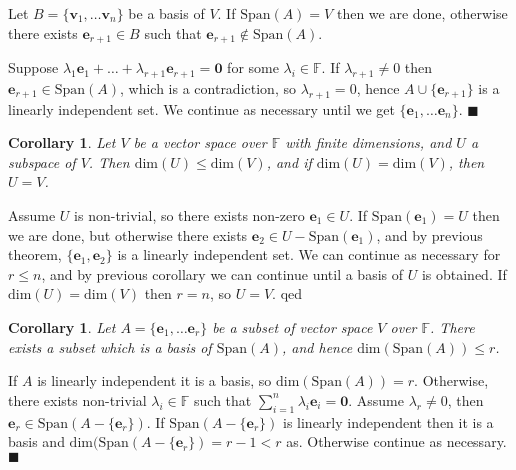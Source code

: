 \documentclass[letter-paper]{tufte-book}
\newtheorem{corollary}[theorem]{\color{pastel-blue}Corollary}
\newenvironment{proof}[1][Proof]{\begin{trivlist}
\item[\hskip \labelsep {\bfseries #1}]}{\end{trivlist}}
\newcommand{\eb}{{\boldsymbol{e}}}
\newcommand{\vb}{{\boldsymbol{v}}}
\newcommand{\qed}{\hfill$\blacksquare$}
\begin{document}
\begin{proof}
  Let $B = \{\vb_1, \ldots \vb_n \}$ be a basis of $V$. If $\mbox{Span}(A) = V$
  then we are done, otherwise there exists $\eb_{r+1} \in B$ such that
  $\eb_{r+1} \not\in \mbox{Span}(A)$.
  
  Suppose $\lambda_1\eb_1 + \ldots + \lambda_{r+1}\eb_{r+1} = \boldsymbol{0}$
  for some $\lambda_i \in \mathbb{F}$. If $\lambda_{r+1} \neq 0$ then $\eb_{r+1}
  \in \mbox{Span}(A)$, which is a contradiction, so $\lambda_{r+1} = 0$, hence
  $A \cup \{\eb_{r+1}\}$ is a linearly independent set. We continue as necessary
  until we get $\{\eb_1, \ldots \eb_n\}$. \qed
\end{proof}

\begin{corollary}
  Let $V$ be a vector space over $\mathbb{F}$ with finite dimensions, and $U$ a
  subspace of $V$. Then $\mbox{dim}(U) \leq \mbox{dim}(V)$, and if
  $\mbox{dim}(U) = \mbox{dim}(V)$, then $U = V$.
\end{corollary}

\begin{proof}
  Assume $U$ is non-trivial, so there exists non-zero $\eb_1 \in U$. If
  $\mbox{Span}(\eb_1) = U$ then we are done, but otherwise there exists $\eb_2
  \in U - \mbox{Span}(\eb_1)$, and by previous theorem, $\{\eb_1, \eb_2\}$ is a
  linearly independent set. We can continue as necessary for $r \leq n$, and by
  previous corollary we can continue until a basis of $U$ is obtained. If
  $\mbox{dim}(U) = \mbox{dim}(V)$ then $r=n$, so $U=V$. qed
\end{proof}

\begin{corollary}
  Let $A = \{\eb_1, \ldots \eb_r\}$ be a subset of vector space $V$ over
  $\mathbb{F}$. There exists a subset which is a basis of $\mbox{Span}(A)$, and
  hence $\mbox{dim}(\mbox{Span}(A)) \leq r$.
\end{corollary}

\begin{proof}
  If $A$ is linearly independent it is a basis, so $\mbox{dim}(\mbox{Span}(A)) =
  r$. Otherwise, there exists non-trivial $\lambda_i \in \mathbb{F}$ such that
  $\sum_{i=1}^n \lambda_i \eb_i = \boldsymbol{0}$. Assume $\lambda_r \neq 0$,
  then $\eb_r \in \mbox{Span}(A - \{\eb_r\})$. If $\mbox{Span}(A - \{\eb_r\})$
  is linearly independent then it is a basis and $\mbox{dim}(\mbox{Span}(A -
  \{\eb_r\}) = r-1 < r$ as. Otherwise continue as necessary. \qed
\end{proof}
\end{document}
